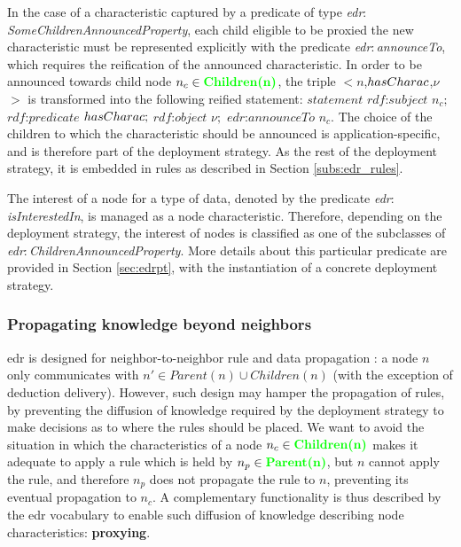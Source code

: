 \documentclass{iosart2c}
\newcommand{\added}[1]{\textcolor{green}{\textbf{#1}}}
\newcommand{\namespace}[1]{\textit{#1$:$}}
\newcommand{\concept}[2]{\namespace{#1}\-\textit{#2}}
\newcommand{\triplet}[3]{$<$#1,\textit{#2},#3$>$}
\begin{document}
In the case of a characteristic captured by a predicate of type \concept{edr}{Some\-Children\-Announced\-Property}, each child eligible to be proxied the new characteristic must be represented explicitly with the predicate \concept{edr}{announce\-To}, which requires the reification of the announced characteristic.
In order to be announced towards child node $n_{c}\in \added{Children(n)}$, the triple \triplet{$n$}{$has\-Charac$}{$\nu$} is transformed into the following reified statement: 
$statement$ $rdf$:$subject$ $n_{c};$ $rdf$:$predicate$ $has\-Charac;$ $rdf$:$object$ $\nu;$ $edr$:$announceTo$ $n_{c}$. 
The choice of the children to which the characteristic should be announced is application-specific, and is therefore part of the deployment strategy.
As the rest of the deployment strategy, it is embedded in rules as described in Section \textsection \ref{subs:edr_rules}.

The interest of a node for a type of data, denoted by the predicate \concept{edr}{is\-Interested\-In}, is managed as a node characteristic.
Therefore, depending on the deployment strategy, the interest of nodes is classified as one of the subclasses of \concept{edr}{Children\-Announced\-Property}.
More details about this particular predicate are provided in Section \textsection \ref{sec:edrpt}, with the instantiation of a concrete deployment strategy.

\subsubsection{Propagating knowledge beyond neighbors}
\label{subsubs:proxying}

\gls{edr} is designed for neighbor-to-neighbor rule and data propagation : a node $n$ only communicates with $n'\in Parent(n)\cup Children(n)$ (with the exception of deduction delivery).
However, such design may hamper the propagation of rules, by preventing the diffusion of knowledge required by the deployment strategy to make decisions as to where the rules should be placed.
We want to avoid the situation in which the characteristics of a node $n_{c}\in \added{Children(n)}$ makes it adequate to apply a rule which is held by $n_{p}\in \added{Parent(n)}$, but $n$ cannot apply the rule, and therefore $n_{p}$ does not propagate the rule to $n$, preventing its eventual propagation to $n_{c}$.
A complementary functionality is thus described by the \gls{edr} vocabulary to enable such diffusion of knowledge describing node characteristics: \textbf{proxying}.
\end{document}
